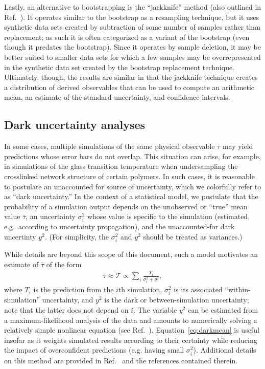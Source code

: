 Lastly, an alternative to bootstrapping is the ``jackknife'' method \cite{Quenouille_Approximate_1949,Quenouille_Notes_1956,Tukey_Bias_1958} (also outlined in Ref.~\cite{Tibshirani1998}). It operates similar to the bootstrap as a resampling technique, but it uses synthetic data sets created by subtraction of some number of samples rather than replacement; as such it is often categorized as a variant of the bootstrap (even though it predates the bootstrap). Since it operates by sample deletion, it may be better suited to smaller data sets for which a few samples may be overrepresented in the synthetic data set created by the bootstrap replacement technique. Ultimately, though, the results are similar in that the jackknife technique creates a distribution of derived observables that can be used to compute an arithmetic mean, an estimate of the standard uncertainty, and confidence intervals.

\subsection{Dark uncertainty analyses}

In some cases, multiple simulations of the same physical observable $\tau$ may yield predictions whose error bars do not overlap.  This situation can arise, for example, in simulations of the glass transition temperature when undersampling the crosslinked network structure of certain polymers.  In such cases, it is reasonable to postulate an unaccounted for source of uncertainty, which we colorfully refer to as ``dark uncertainty.''  In the context of a statistical model, we postulate that the probability of a simulation output depends on the unobserved or ``true'' mean value $\bar \tau$, an uncertainty $\sigma_i^2$ whose value is specific to the simulation (estimated, e.g.\ according to uncertainty propagation), and the unaccounted-for dark uncertinty $y^2$.  (For simplicity, the $\sigma_i^2$ and $y^2$ should be treated as variances.)

While details are beyond this scope of this document, such a model motivates an estimate of $\bar \tau$ of the form
\begin{align}
\bar \tau \approx \mathcal T \propto \sum_i \frac{T_i}{\sigma_i^2 + y^2}, \label{eq:darkmean}
\end{align}
where $T_i$ is the prediction from the $i$th simulation, $\sigma_i^2$ is its associated ``within-simulation'' uncertainty, and $y^2$ is the dark or between-simulation uncertainty; note that the latter does not depend on $i$.  The variable $y^2$ can be estimated from a maximum-likelihood analysis of the data and amounts to numerically solving a relatively simple nonlinear equation (see Ref.~\cite{patrone1}).  Equation~\eqref{eq:darkmean} is useful insofar as it weights simulated results according to their certainty while reducing the impact of overconfident predictions (e.g. having small $\sigma_i^2$).  Additional details on this method are provided in Ref.~\cite{patrone1} and the references contained therein.